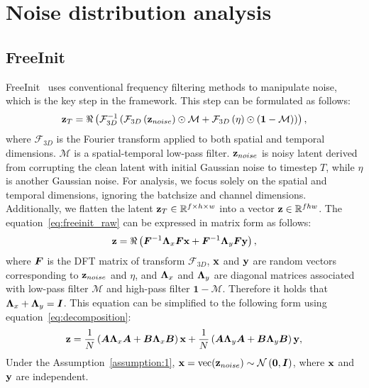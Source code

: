 \section{Noise distribution analysis}
\label{appendix:noise_distribution_analysis}
\subsection{FreeInit}
\label{appendix:freeinit}
FreeInit~\citep{wu2023freeinit} uses conventional frequency filtering methods to manipulate noise, which is the key step in the framework. This step can be formulated as follows:
\begin{equation}
\label{eq:freeinit_raw}
    \mathbf{z}_T = \Re\left( \mathcal{F}_{3D}^{-1}\left(\mathcal{F}_{3D}\left(\mathbf{z}_{noise}\right)\odot\mathcal{M} + \mathcal{F}_{3D}\left(\eta\right)\odot(\bm{1}-\mathcal{M})\right) \right),
\end{equation}
where $\mathcal{F}_{3D}$ is the Fourier transform applied to both spatial and temporal dimensions. $\mathcal{M}$ is a spatial-temporal low-pass filter. $\mathbf{z}_{noise}$ is noisy latent derived from corrupting the clean latent with initial Gaussian noise to timestep $T$, while $\eta$ is another Gaussian noise. 
For analysis, we focus solely on the spatial and temporal dimensions, ignoring the batchsize and channel dimensions. Additionally, we flatten the latent $\mathbf{z}_T\in\mathbb{R}^{f\times h \times w}$ into a vector $\mathbf{z} \in \mathbb{R}^{fhw}$. The equation~\ref{eq:freeinit_raw} can be expressed in matrix form as follows:
\begin{equation}
    \mathbf{z} = \Re\left( {\bm{F}}^{-1}{\bm{\Lambda}}_x{\bm{F}}\mathbf{x} + {\bm{F}}^{-1}{\bm{\Lambda}}_y{\bm{F}}\mathbf{y} \right),
\end{equation}
where ${\bm{F}}$ is the DFT matrix of transform $\mathcal{F}_{3D}$, $\mathbf{x}$ and $\mathbf{y}$ are random vectors corresponding to $\mathbf{z}_{noise}$ and $\eta$, and ${\bm{\Lambda}}_x$ and
${\bm{\Lambda}}_y$ are diagonal matrices associated with low-pass filter $\mathcal{M}$ and high-pass filter $\bm{1}-\mathcal{M}$. Therefore it holds that ${\bm{\Lambda}}_x+{\bm{\Lambda}}_y={\bm{I}}$.
This equation can be simplified to the following form using equation~\ref{eq:decomposition}:
\begin{equation}
    \mathbf{z} = \frac{1}{N}\left({\bm{A}}{\bm{\Lambda}}_x{\bm{A}} + {\bm{B}}{\bm{\Lambda}}_x{\bm{B}}\right)\mathbf{x} 
      + \frac{1}{N}\left( {\bm{A}}{\bm{\Lambda}}_y{\bm{A}} + {\bm{B}}{\bm{\Lambda}}_y{\bm{B}}\right)\mathbf{y},
\end{equation}
Under the Assumption~\ref{assumption:1}, $\mathbf{x}=\text{vec}(\mathbf{z}_{noise}) \sim\mathcal{N}\left(\mathbf{0},{\bm{I}}\right)$, where $\mathbf{x}$ and $\mathbf{y}$ are independent. 
